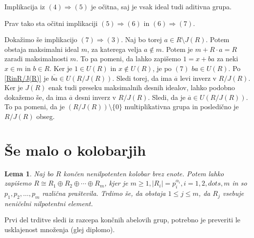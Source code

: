 \documentclass[a4paper, 12pt]{amsart}
\theoremstyle{definition} %
\theoremstyle{plain} %
\newtheorem{lema}[definicija]{Lema}
\begin{document}
Implikacija iz $(4)\Rightarrow (5)$ je očitna, saj je vsak ideal tudi aditivna grupa.

Prav tako sta očitni implikaciji $(5) \Rightarrow (6) $ in $(6) \Rightarrow (7)$. 

Dokažimo še implikacijo $(7) \Rightarrow (3)$. Naj bo torej $a\in R\setminus J(R)$. Potem obstaja maksimalni ideal $m$, za katerega velja $a\notin m$. Potem je $m+ R\cdot a = R$ zaradi maksimalnosti $m$. To pa pomeni, da lahko zapišemo $1 = x+ba$ za neki $x\in m$ in $b\in R$. Ker je $1\in U(R)$ in $x\notin U(R)$, je po $(7)$ $ba \in U(R)$. Po \ref{RinR/J(R)} je $\overline{ba} \in U(R/J(R))$. Sledi torej, da ima $\overline{a}$ levi inverz v $R/J(R)$. Ker je $J(R)$ enak tudi preseku maksimalnih desnih idealov, lahko podobno dokažemo še, da ima $\overline{a}$ desni inverz v $R/J(R)$. Sledi, da je $\overline{a}\in U(R/J(R))$. To pa pomeni, da je $(R/J(R)) \setminus \{0\}$ multiplikativna grupa in posledično je $R/J(R) $ obseg.
\endproof

\section{Še malo o kolobarjih}

\begin{lema}
\label{nilpotent}
Naj bo $R$ končen nenilpotenten kolobar brez enote. Potem lahko zapišemo $R\cong R_1 \oplus R_2 \oplus \cdots \oplus R_m$, kjer je $m \ge 1, |R_i| = p_i^{\alpha_i}, i=1, 2, dots, m$ in so $p_1,p_2,\dots,p_m$ različna praštevila. Trdimo še, da obstaja $1 \le j \le m$, da $R_j$ vsebuje neničelni nilpotentni element.
\end{lema}

\proof
Prvi del trditve sledi iz razcepa končnih abelovih grup, potrebno je preveriti le usklajenost množenja (glej diplomo). 
\end{document}
